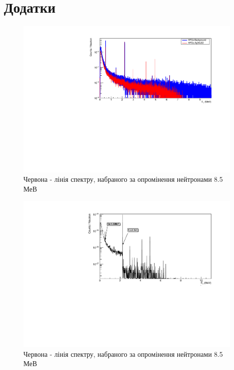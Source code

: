 \documentclass[a4paper, 14pt]{article}
\numberwithin{equation}{section}
\numberwithin{table}{section}
\begin{document}
\section{Додатки}
\setcounter{figure}{0}
\begin{figure}[h!]
	\centering \includegraphics[width=1\textwidth]{res/Ag3AuS2_8_5MeVFonClasic.pdf}
	\caption{Червона - лінія спектру, набраного за опромінення нейтронами 8.5 МеВ}
	\label{ris:Ag3AuS28_5MeV}	
\end{figure} 
\begin{figure}[h!]
	\centering \includegraphics[width=1\textwidth]{res/AuAgS28MeV.pdf}
	\caption{Червона - лінія спектру, набраного за опромінення нейтронами 8.5 МеВ}
	\label{ris:Ag3AuS22_8MeV}	
\end{figure}
\end{document}
